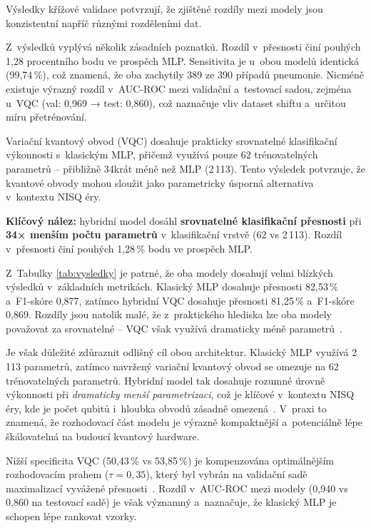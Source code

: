 \documentclass[12pt, a4paper]{report}
\begin{document}
Výsledky křížové validace potvrzují, že zjištěné rozdíly mezi modely jsou konzistentní napříč různými rozděleními dat.

Z~výsledků vyplývá několik zásadních poznatků. Rozdíl v~přesnosti činí pouhých 1{,}28 procentního bodu ve prospěch MLP. Sensitivita je u~obou modelů identická (99{,}74\,\%), což znamená, že oba zachytily 389 ze 390 případů pneumonie. Nicméně existuje výrazný rozdíl v~AUC-ROC mezi validační a~testovací sadou, zejména u~VQC (val: 0{,}969 → test: 0{,}860), což naznačuje vliv dataset shiftu a~určitou míru přetrénování.

Variační kvantový obvod (VQC) dosahuje prakticky srovnatelné klasifikační výkonnosti s~klasickým MLP, přičemž využívá pouze 62 trénovatelných parametrů -- přibližně 34krát méně než MLP (2\,113). Tento výsledek potvrzuje, že kvantové obvody mohou sloužit jako parametricky úsporná alternativa v~kontextu NISQ éry.

\textbf{Klíčový nález:} hybridní model dosáhl \textbf{srovnatelné klasifikační přesnosti} při \textbf{34× menším počtu parametrů} v~klasifikační vrstvě (62 vs 2\,113). Rozdíl v~přesnosti činí pouhých 1{,}28\,\% bodu ve prospěch MLP.

Z~Tabulky \ref{tab:vysledky} je patrné, že oba modely dosahují velmi blízkých výsledků v~základních metrikách. Klasický MLP dosahuje přesnosti 82{,}53\,\% a~F1-skóre 0{,}877, zatímco hybridní VQC dosahuje přesnosti 81{,}25\,\% a~F1-skóre 0{,}869. Rozdíly jsou natolik malé, že z~praktického hlediska lze oba modely považovat za srovnatelné -- VQC však využívá dramaticky méně parametrů~\cite{pneumonia_detection_qml}.

Je však důležité zdůraznit odlišný cíl obou architektur. Klasický MLP využívá 2\,113 parametrů, zatímco navržený variační kvantový obvod se omezuje na 62 trénovatelných parametrů. Hybridní model tak dosahuje rozumné úrovně výkonnosti při \emph{dramaticky menší parametrizaci}, což je klíčové v~kontextu NISQ éry, kde je počet qubitů i~hloubka obvodů zásadně omezená~\cite{mitarai_qcl}. V~praxi to znamená, že rozhodovací část modelu je výrazně kompaktnější a~potenciálně lépe škálovatelná na budoucí kvantový hardware.

Nižší specificita VQC (50{,}43\,\% vs 53{,}85\,\%) je kompenzována optimálnějším rozhodovacím prahem ($\tau = 0{,}35$), který byl vybrán na validační sadě maximalizací vyvážené přesnosti~\cite{radiologist_error_rate}. Rozdíl v~AUC-ROC mezi modely (0{,}940 vs 0{,}860 na testovací sadě) je však významný a~naznačuje, že klasický MLP je schopen lépe rankovat vzorky.
\end{document}
